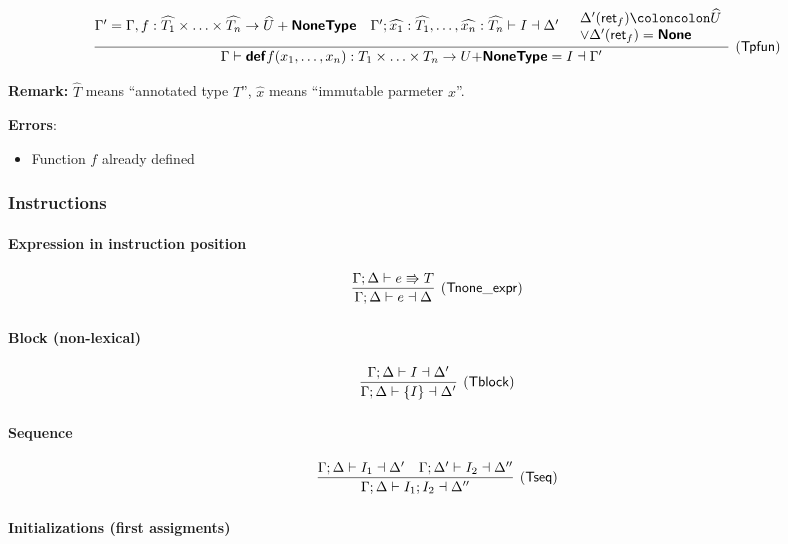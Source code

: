 \documentclass[a4paper]{article}
\newcommand{\kw}[1]{\textsf{\textbf{#1}}}
\newcommand{\mcode}[1]{\mathsf{#1}}
\newcommand{\colcol}{\coloncolon}
\newcommand{\yield}{\Rrightarrow}
\newcommand{\fun}[1]{\mathsf{#1}}
\begin{document}
$$
\infer[(\fun{Tpfun})]{\Gamma \vdash \kw{def} f(x_1,\ldots,x_n) : T_1 \times \ldots \times T_n \rightarrow U \mathsf{+} \kw{NoneType} = I \dashv \Gamma'}
{\Gamma'=\Gamma,f:\widehat{T_1}\times \ldots \times \widehat{T_n}\rightarrow \widehat{U} + \kw{NoneType} & \Gamma';\widehat{x_1}:\widehat{T_1},\ldots,\widehat{x_n}:\widehat{T_n} \vdash I \dashv \Delta' & \begin{array}{l} \Delta'(\fun{ret}_f) \colcol \widehat{U} \\ \lor \Delta'(\fun{ret}_f)=\kw{None} \end{array}}
$$

\textbf{Remark:} $\widehat{T}$ means ``annotated type $T$'', $\widehat{x}$ means ``immutable parmeter $x$''.

\textbf{Errors}:
\begin{itemize}
\item Function $f$ already defined
\end{itemize}


\subsubsection{Instructions}

\paragraph{Expression in instruction position}

$$
\infer[(\fun{Tnone\_expr})]{\Gamma ; \Delta \vdash e \dashv \Delta}
{\Gamma;\Delta \vdash e \yield T}
$$

\paragraph{Block (non-lexical)}

$$
\infer[(\fun{Tblock})]{\Gamma;\Delta \vdash \mcode{\{}I\mcode{\}} \dashv \Delta'}
{\Gamma;\Delta \vdash I \dashv \Delta'}
$$

\paragraph{Sequence}

$$
\infer[(\fun{Tseq})]{\Gamma;\Delta \vdash I_1;I_2 \dashv \Delta''}
{\Gamma;\Delta \vdash I_1 \dashv \Delta' & \Gamma;\Delta'\vdash I_2 \dashv \Delta''}
$$

\paragraph{Initializations (first assigments)}
\end{document}
